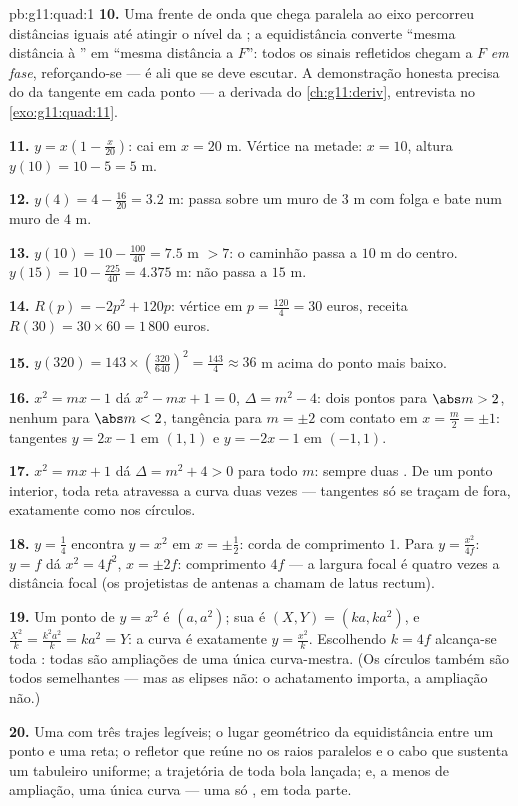 \begin{solution}{pb:g11:quad:1}
\textbf{10.} Uma frente de onda que chega paralela ao eixo
percorreu distâncias iguais até atingir o nível da ; a
equidistância converte ``mesma distância à '' em ``mesma
distância a $F$'': todos os sinais refletidos chegam a $F$
\emph{em fase}, reforçando-se --- é ali que se deve escutar. A
demonstração honesta precisa do  da tangente
em cada ponto --- a derivada do \cref{ch:g11:deriv},
entrevista no \cref{exo:g11:quad:11}.

\textbf{11.} $y = x\left(1 - \frac{x}{20}\right)$: cai em
$x = 20$ m. Vértice na metade: $x = 10$, altura
$y(10) = 10 - 5 = 5$ m.

\textbf{12.} $y(4) = 4 - \frac{16}{20} = 3.2$ m: passa sobre um
muro de $3$ m com folga e bate num muro de $4$ m.

\textbf{13.} $y(10) = 10 - \frac{100}{40} = 7.5$ m $> 7$: o
caminhão passa a $10$ m do centro. $y(15) = 10 -
\frac{225}{40} = 4.375$ m: não passa a $15$ m.

\textbf{14.} $R(p) = -2p^2 + 120p$: vértice em
$p = \frac{120}{4} = 30$ euros, receita
$R(30) = 30 \times 60 = 1\,800$ euros.

\textbf{15.} $y(320) = 143 \times \left(\frac{320}{640}\right)^2
= \frac{143}{4} \approx 36$ m acima do ponto mais baixo.

\textbf{16.} $x^2 = mx - 1$ dá $x^2 - mx + 1 = 0$,
$\Delta = m^2 - 4$: dois pontos para $\abs m > 2$, nenhum para
$\abs m < 2$, tangência para $m = \pm 2$ com contato em
$x = \frac m2 = \pm 1$: tangentes $y = 2x - 1$ em $(1, 1)$ e
$y = -2x - 1$ em $(-1, 1)$.

\textbf{17.} $x^2 = mx + 1$ dá $\Delta = m^2 + 4 > 0$ para todo
$m$: sempre duas . De um ponto interior, toda reta
atravessa a curva duas vezes --- tangentes só se traçam de
fora, exatamente como nos círculos.

\textbf{18.} $y = \frac14$ encontra $y = x^2$ em
$x = \pm\frac12$: corda de comprimento $1$. Para
$y = \frac{x^2}{4f}$: $y = f$ dá $x^2 = 4f^2$, $x = \pm 2f$:
comprimento $4f$ --- a largura focal é quatro vezes a distância
focal (os projetistas de antenas a chamam de latus rectum).

\textbf{19.} Um ponto de $y = x^2$ é $(a, a^2)$; sua  é
$(X, Y) = (ka, ka^2)$, e $\frac{X^2}{k} = \frac{k^2a^2}{k} =
ka^2 = Y$: a curva  é exatamente $y = \frac{x^2}{k}$.
Escolhendo $k = 4f$ alcança-se toda : todas são
ampliações de uma única curva-mestra. (Os círculos também são
todos semelhantes --- mas as elipses não: o achatamento importa,
a ampliação não.)

\textbf{20.} Uma  com três trajes legíveis; o lugar
geométrico da equidistância entre um ponto e uma reta; o
refletor que reúne no  os raios paralelos e o cabo que
sustenta um tabuleiro uniforme; a trajetória de toda bola
lançada; e, a menos de ampliação, uma única curva --- uma só
, em toda parte.
\end{solution}
